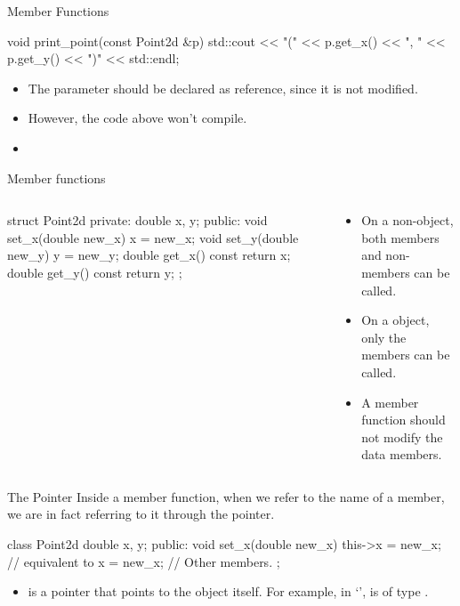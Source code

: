 \documentclass{beamer}
\begin{document}
\begin{frame}[fragile]{\const Member Functions}
    \begin{cpp}
void print_point(const Point2d &p) {
  std::cout << "(" << p.get_x() << ", "
            << p.get_y() << ")" << std::endl;
}
    \end{cpp}
    \begin{itemize}
        \item The parameter should be declared as \const reference, since it is not modified.
        \item However, the code above won't compile.
        \item {}
    \end{itemize}
\end{frame}

\begin{frame}[fragile]{\const Member functions}
    \begin{columns}
        \begin{column}{0.5\linewidth}
            \begin{cpp}
struct Point2d {
 private:
  double x, y;
 public:
  void set_x(double new_x)
    { x = new_x; }
  void set_y(double new_y)
    { y = new_y; }
  double get_x() const
    { return x; }
  double get_y() const
    { return y; }
};
            \end{cpp}        
        \end{column}
        \begin{column}{0.5\linewidth}
            \begin{itemize}
                \item On a non-\const object, both \const members and non-\const members can be called.
                \item On a \const object, only the \const members can be called.
                \item A \const member function should not modify the data members.
            \end{itemize}
        \end{column}
    \end{columns}
\end{frame}

\begin{frame}[fragile]{The \this Pointer}
    Inside a member function, when we refer to the name of a member, we are in fact referring to it through the \this pointer.
    \begin{cpp}
class Point2d {
  double x, y;
 public:
  void set_x(double new_x) {
    this->x = new_x;    // equivalent to x = new_x;
  }
  // Other members.
};
    \end{cpp}
    \begin{itemize}
        \item \this is a pointer that points to the object itself. For example, in `', \this is of type .
    \end{itemize}
\end{frame}
\end{document}
